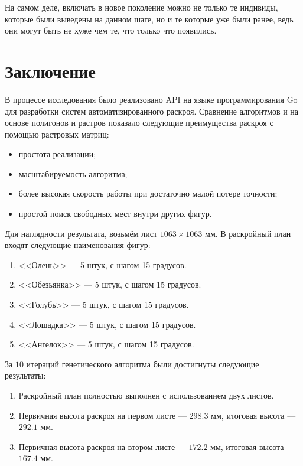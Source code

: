 \documentclass[14pt]{extarticle}
\begin{document}
	На самом деле, включать в новое поколение можно не только те индивиды, которые были выведены на данном шаге, но и те которые уже были ранее, ведь они могут быть не хуже чем те, что только что появились.
	\section{Заключение}
	В процессе исследования было реализовано API на языке программирования Go для разработки систем автоматизированного раскроя. Сравнение алгоритмов и на основе полигонов и растров показало следующие преимущества раскроя с помощью растровых матриц:
	\begin{itemize}
		\item простота реализации;
		\item масштабируемость алгоритма;
		\item более высокая скорость работы при достаточно малой потере точности;
		\item простой поиск свободных мест внутри других фигур.		
	\end{itemize}

	Для наглядности результата, возьмём лист $1063\times1063$ мм. В раскройный план входят следующие наименования фигур:
	\begin{enumerate}
		\item <<Олень>> --- 5 штук, с шагом 15 градусов.
		\item <<Обезьянка>> --- 5 штук, с шагом 15 градусов.
		\item <<Голубь>> --- 5 штук, с шагом 15 градусов.
		\item <<Лошадка>> --- 5 штук, с шагом 15 градусов.
		\item <<Ангелок>> --- 5 штук, с шагом 15 градусов.
	\end{enumerate}


	За $10$ итераций генетического алгоритма были достигнуты следующие результаты:
	\begin{enumerate}
		\item Раскройный план полностью выполнен с использованием двух листов.
		\item Первичная высота раскроя на первом листе --- $298.3$ мм, итоговая высота --- $292.1$ мм.
		\item Первичная высота раскроя на втором листе --- $172.2$ мм, итоговая высота --- $167.4$ мм.
	\end{enumerate}
\end{document}
